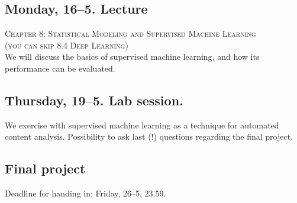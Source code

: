 \subsection*{Monday, 16--5. Lecture}
\textsc{ Chapter 8: Statistical Modeling and Supervised Machine Learning}\\
\textsc{ (you can skip 8.4 Deep Learning)}\\

We will discuss the basics of supervised machine learning, and how its performance can be evaluated. 

\subsection*{Thursday, 19--5. Lab session.}
We exercise with supervised machine learning as a technique for automated content analysis. Possibility to ask last (!) questions regarding the final project.

\subsection*{Final project}
Deadline for handing in: Friday, 26--5, 23.59.



